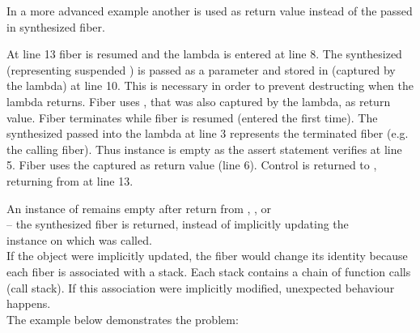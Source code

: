 In a more advanced example another \fiber is used as return value instead of the
passed in synthesized fiber.

At line 13 fiber  is resumed and the lambda is entered at line 8. The
synthesized \fiber\xspace {} (representing suspended \main) is passed as a
parameter  and stored in  (captured by the lambda) at line 10.
This is necessary in order to prevent destructing  when the lambda
returns. Fiber  uses , that was also captured by the lambda, as
return value. Fiber  terminates while fiber  is resumed (entered
the first time). The synthesized \fiber\xspace {} passed into the lambda at line 3
represents the terminated fiber  (e.g. the calling fiber). Thus instance
 is empty as the assert statement verifies at line 5. Fiber  uses
the captured \fiber\xspace {} as return value (line 6). Control is returned to
\main, returning from  at line 13.\\


\label{fiberreturn}
An instance of \fiber remains empty after return from \resume, \resumewith,
\xtresume or\\
\xtresumewith -- the synthesized fiber is returned, instead of
implicitly updating the\\\fiber instance on which \resume was called.\\
If the \fiber object were implicitly updated, the fiber would 
change its identity because each fiber is associated with a stack. Each stack
contains a chain of function calls (call stack). If this association were
implicitly modified, unexpected behaviour happens.\\
The example below demonstrates the problem:

